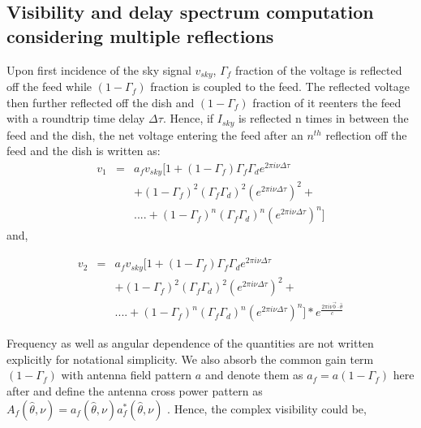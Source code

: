 \documentclass[iop]{emulateapj}
\newcommand{\volt}{{v}}
\newcommand{\bmvolt}{{a}}
\newcommand{\beam}{{A}}
\newcommand{\thhat}{{\hat\theta}}
\newcommand{\fngexp}{{e^{\frac{2\pi i\nu\vec{b}\cdot\thhat}{c}}}}
\newcommand{\dfngexp}{{e^{2\pi i\nu \Delta \tau}}}
\begin{document}
\subsection{Visibility and delay spectrum computation considering multiple reflections}
Upon first incidence of the sky signal $\volt_{sky}$, $\Gamma_{f}$ fraction of the voltage is reflected off the feed while $(1-\Gamma_{f})$ fraction is coupled to the feed. The reflected voltage then further reflected off the dish and $(1-\Gamma_{f}) $ fraction of it reenters the feed with a roundtrip time delay $\Delta \tau$. Hence, if $I_{sky}$ is reflected n times in between the feed and the dish, the net voltage entering the feed after an
$n^{th}$ reflection off the feed and the dish is written as:
\begin{eqnarray}
\volt_{1} & = &  a_{f} \volt_{sky}[1+ (1-\Gamma_{f})\Gamma_{f}\Gamma_{d} \dfngexp \nonumber \\
	&& + (1-\Gamma_{f})^{2} (\Gamma_{f}\Gamma_{d})^2  (\dfngexp)^{2}+ \nonumber \\
&&  ....+ (1-\Gamma_{f})^{n}(\Gamma_{f}\Gamma_{d})^{n} (\dfngexp)^{n}] \nonumber
\end{eqnarray}
and, 

\begin{eqnarray}
\volt_{2} & = &  a_{f} \volt_{sky}[1+ (1-\Gamma_{f})\Gamma_{f}\Gamma_{d} \dfngexp \nonumber\\
&&+ (1-\Gamma_{f})^{2} (\Gamma_{f}\Gamma_{d})^2  (\dfngexp)^{2}+ \nonumber \\
&& ....+ (1-\Gamma_{f})^{n}(\Gamma_{f}\Gamma_{d})^{n} (\dfngexp)^{n}] \ast \fngexp \nonumber
\end{eqnarray}




Frequency as well as angular dependence of the quantities are not written explicitly for notational simplicity. We also absorb the common gain term $(1-\Gamma_{f})$ with antenna field pattern $a$ and denote them as $a_{f}= a(1-\Gamma_{f})$ here after and define the antenna cross power pattern as $\beam_{f}(\thhat,\nu)=\bmvolt_{f}(\thhat,\nu)\bmvolt_{f}^{*}(\thhat,\nu)$ . Hence, the complex visibility could be, 
\end{document}
